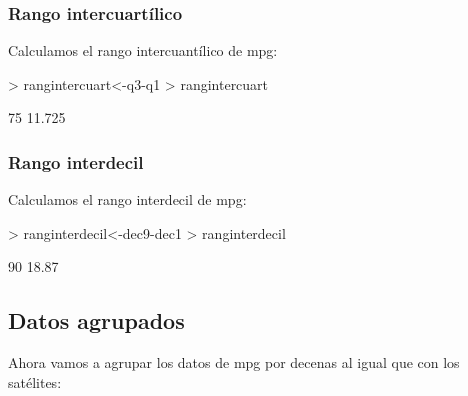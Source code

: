 \documentclass [a4paper] {article}
\begin{document}
\subsubsection{Rango intercuartílico}
Calculamos el rango intercuantílico de mpg:

\begin{Schunk}
\begin{Sinput}
> rangintercuart<-q3-q1
> rangintercuart
\end{Sinput}
\begin{Soutput}
   75%
11.725 
\end{Soutput}
\end{Schunk}
\subsubsection{Rango interdecil}
Calculamos el rango interdecil de mpg:

\begin{Schunk}
\begin{Sinput}
> ranginterdecil<-dec9-dec1
> ranginterdecil
\end{Sinput}
\begin{Soutput}
  90%
18.87 
\end{Soutput}
\end{Schunk}

\subsection{Datos agrupados}
Ahora vamos a agrupar los datos de mpg por decenas al igual que con los satélites:
\end{document}

